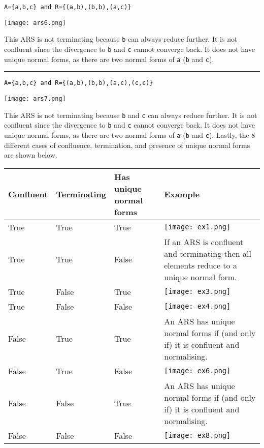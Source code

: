 \documentclass{article}
\theoremstyle{theorem}
\theoremstyle{definition}
\theoremstyle{remark}
\begin{document}
\noindent \texttt{A=\{a,b,c\} and R=\{(a,b),(b,b),(a,c)\}}
\begin{center}
    \texttt{[image: ars6.png]}
\end{center}
This ARS is not terminating because \texttt{b} can always reduce further. It is not confluent since the divergence to \texttt{b} and \texttt{c} cannot converge back. It does not have unique normal forms, as there are two normal forms of \texttt{a} (\texttt{b} and \texttt{c}).

\noindent\rule{\textwidth}{1pt}

\noindent \texttt{A=\{a,b,c\} and R=\{(a,b),(b,b),(a,c),(c,c)\}}
\begin{center}
    \texttt{[image: ars7.png]}
\end{center}
This ARS is not terminating because \texttt{b} and \texttt{c} can always reduce further. It is not confluent since the divergence to \texttt{b} and \texttt{c} cannot converge back. It does not have unique normal forms, as there are two normal forms of \texttt{a} (\texttt{b} and \texttt{c}).
\newpage
Lastly, the 8 different cases of confluence, termination, and presence of unique normal forms are shown below.

\begin{center}
\begin{tabular}{ | m{5em} | m{5em}| m{12em} | m{3.2cm} | }
 \hline
 Confluent & Terminating & Has unique normal forms & Example \\
 \hline\hline
 True & True & True & \texttt{[image: ex1.png]} \\ 
 \hline
 True & True & False & If an ARS is confluent and terminating then all elements reduce to a unique normal form. \\
 \hline
 True & False & True & \texttt{[image: ex3.png]} \\
 \hline
 True & False & False & \texttt{[image: ex4.png]} \\
 \hline
 False & True & True & An ARS has unique normal forms if (and only if) it is confluent and normalising. \\
 \hline
 False & True & False & \texttt{[image: ex6.png]} \\
 \hline
 False & False & True & An ARS has unique normal forms if (and only if) it is confluent and normalising. \\
 \hline
 False & False & False & \texttt{[image: ex8.png]} \\
 \hline
\end{tabular}
\end{center}
\end{document}
